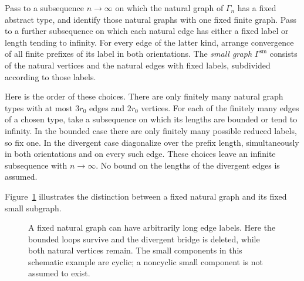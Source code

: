 \begin{definition}
\label{car:small-graph}
Pass to a subsequence $n\to\infty$ on which the natural graph of
$\Gamma_n$ has a fixed abstract type, and identify those natural
graphs with one fixed finite graph.  Pass to a further subsequence
on which each natural edge has either a fixed label or length tending
to infinity.  For every edge of the latter kind, arrange convergence
of all finite prefixes of its label in both orientations.  The
\emph{small graph} $\Gamma^{\mathrm{sm}}$ consists of the natural
vertices and the natural edges with fixed labels, subdivided according
to those labels.
\end{definition}

Here is the order of these choices.  There are only finitely many
natural graph types with at most $3r_0$ edges and $2r_0$ vertices.
For each of the finitely many edges of a chosen type, take a
subsequence on which its lengths are bounded or tend to infinity.
In the bounded case there are only finitely many possible reduced
labels, so fix one.  In the divergent case diagonalize over the
prefix length, simultaneously in both orientations and on every
such edge.  These choices leave an infinite subsequence with
$n\to\infty$.  No bound on the lengths of the divergent edges is
assumed.

Figure~\ref{car:small-figure} illustrates the distinction between a
fixed natural graph and its fixed small subgraph.

\suppressfloats[t]
\begin{figure}[htbp]
\centering
{}
\caption{A fixed natural graph can have arbitrarily long edge labels.
Here the bounded loops survive and the divergent bridge is deleted,
while both natural vertices remain. The small components in this
schematic example are cyclic; a noncyclic small component is not
assumed to exist.}
\label{car:small-figure}
\end{figure}

